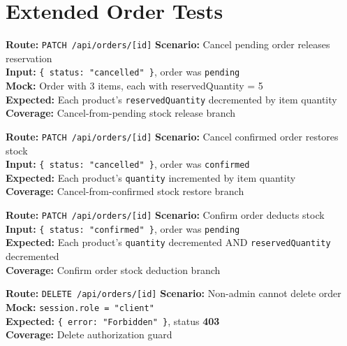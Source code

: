 \documentclass[12pt,a4paper]{report}
\newcommand{\pone}{\textbf{\color{p1red}P1}}
\newcommand{\ptwo}{\textbf{\color{p2orange}P2}}
\begin{document}
\section{Extended Order Tests}

\begin{tcolorbox}[testbox,title={ORD-017 \hfill \ptwo}]
\textbf{Route:} \texttt{PATCH /api/orders/[id]} \quad \textbf{Scenario:} Cancel pending order releases reservation \\
\textbf{Input:} \texttt{\{ status: "cancelled" \}}, order was \texttt{pending} \\
\textbf{Mock:} Order with 3 items, each with reservedQuantity = 5 \\
\textbf{Expected:} Each product's \texttt{reservedQuantity} decremented by item quantity \\
\textbf{Coverage:} Cancel-from-pending stock release branch
\end{tcolorbox}

\begin{tcolorbox}[testbox,title={ORD-018 \hfill \ptwo}]
\textbf{Route:} \texttt{PATCH /api/orders/[id]} \quad \textbf{Scenario:} Cancel confirmed order restores stock \\
\textbf{Input:} \texttt{\{ status: "cancelled" \}}, order was \texttt{confirmed} \\
\textbf{Expected:} Each product's \texttt{quantity} incremented by item quantity \\
\textbf{Coverage:} Cancel-from-confirmed stock restore branch
\end{tcolorbox}

\begin{tcolorbox}[testbox,title={ORD-019 \hfill \ptwo}]
\textbf{Route:} \texttt{PATCH /api/orders/[id]} \quad \textbf{Scenario:} Confirm order deducts stock \\
\textbf{Input:} \texttt{\{ status: "confirmed" \}}, order was \texttt{pending} \\
\textbf{Expected:} Each product's \texttt{quantity} decremented AND \texttt{reservedQuantity} decremented \\
\textbf{Coverage:} Confirm order stock deduction branch
\end{tcolorbox}

\begin{tcolorbox}[testbox,title={ORD-020 \hfill \pone}]
\textbf{Route:} \texttt{DELETE /api/orders/[id]} \quad \textbf{Scenario:} Non-admin cannot delete order \\
\textbf{Mock:} \texttt{session.role = "client"} \\
\textbf{Expected:} \texttt{\{ error: "Forbidden" \}}, status \textbf{403} \\
\textbf{Coverage:} Delete authorization guard
\end{tcolorbox}
\end{document}
